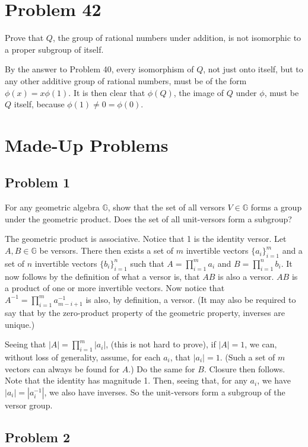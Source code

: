 \documentclass[12pt]{article}
\newcommand{\G}{\mathbb{G}}
\begin{document}
\section*{Problem 42}

Prove that $Q$, the group of rational numbers under addition, is not
isomorphic to a proper subgroup of itself.

By the answer to Problem 40, every isomorphism of $Q$, not just onto itself,
but to any other additive group of rational numbers, must be of the form $\phi(x)=x\phi(1)$.
It is then clear that $\phi(Q)$, the image of $Q$ under $\phi$, must be $Q$ itself,
because $\phi(1)\neq 0=\phi(0)$.

\section*{Made-Up Problems}

\subsection*{Problem 1}

For any geometric algebra $\G$, show that
the set of all versors $V\in\G$ forms a group under the geometric product.
Does the set of all unit-versors form a subgroup?

The geometric product is associative.
Notice that 1 is the identity versor.  Let $A,B\in\G$ be versors.
There then exists a set of $m$ invertible vectors $\{a_i\}_{i=1}^m$ and
a set of $n$ invertible vectors $\{b_i\}_{i=1}^n$ such that
$A=\prod_{i=1}^m a_i$ and $B=\prod_{i=1}^n b_i$.
It now follows by the definition of what a versor is, that $AB$ is also a versor.
$AB$ is a product of one or more invertible vectors.
Now notice that $A^{-1}=\prod_{i=1}^m a_{m-i+1}^{-1}$ is also, by
definition, a versor.  (It may also be required to say that by the zero-product
property of the geometric property, inverses are unique.)

Seeing that $|A|=\prod_{i=1}^m |a_i|$, (this is not hard to prove), if $|A|=1$, we can, without loss
of generality, assume, for each $a_i$, that $|a_i|=1$.  (Such a set of $m$
vectors can always be found for $A$.)  Do the same for $B$.  Closure then follows.  Note that the identity
has magnitude 1.  Then, seeing that, for any $a_i$, we have $|a_i|=|a_i^{-1}|$,
we also have inverses.  So the unit-versors form a subgroup of the versor group.

\subsection*{Problem 2}
\end{document}
